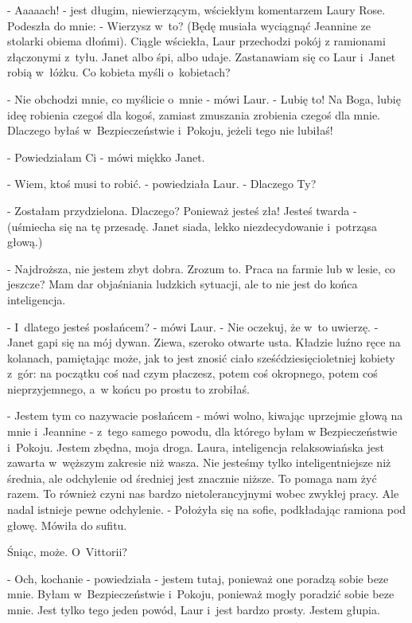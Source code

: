 \documentclass[oneside,polish,12pt,sfheadings]{mwbk}
\begin{document}
- Aaaaach! - jest długim, niewierzącym, wściekłym komentarzem Laury
Rose. Podeszła do mnie: - Wierzysz w~to? (Będę musiała wyciągnąć Jeannine
ze stolarki obiema dłońmi). Ciągle wściekła, Laur przechodzi pokój
z ramionami złączonymi z~tyłu. Janet albo śpi, albo udaje. Zastanawiam
się co Laur i~Janet robią w~łóżku. Co kobieta myśli o~kobietach?

- Nie obchodzi mnie, co myślicie o~mnie - mówi Laur. - Lubię to! Na
Boga, lubię ideę robienia czegoś dla kogoś, zamiast zmuszania zrobienia
czegoś dla mnie. Dlaczego byłaś w~Bezpieczeństwie i~Pokoju, jeżeli
tego nie lubiłaś!

- Powiedziałam Ci - mówi miękko Janet.

- Wiem, ktoś musi to robić. - powiedziała Laur. - Dlaczego Ty?

- Zostałam przydzielona. Dlaczego? Ponieważ jesteś zła! Jesteś twarda - (uśmiecha się na tę przesadę. Janet siada, lekko niezdecydowanie i~potrząsa głową.)

- Najdroższa, nie jestem zbyt dobra. Zrozum to. Praca na farmie lub
w lesie, co jeszcze? Mam dar objaśniania ludzkich sytuacji, ale to
nie jest do końca inteligencja.

- I~dlatego jesteś posłańcem? - mówi Laur. - Nie oczekuj, że w~to
uwierzę. - Janet gapi się na mój dywan. Ziewa, szeroko otwarte usta.
Kładzie luźno ręce na kolanach, pamiętając może, jak to jest znosić
ciało sześćdziesięcioletniej kobiety z~gór: na początku coś nad czym
płaczesz, potem coś okropnego, potem coś nieprzyjemnego, a~w końcu
po prostu to zrobiłaś.

- Jestem tym co nazywacie posłańcem - mówi wolno, kiwając uprzejmie
głową na mnie i~Jeannine - z~tego samego powodu, dla którego byłam
w Bezpieczeństwie i~Pokoju. Jestem zbędna, moja droga. Laura, inteligencja
relaksowiańska jest zawarta w~węższym zakresie niż wasza. Nie jesteśmy
tylko inteligentniejsze niż średnia, ale odchylenie od średniej jest
znacznie niższe. To pomaga nam żyć razem. To również czyni nas bardzo
nietolerancyjnymi wobec zwykłej pracy. Ale nadal istnieje pewne odchylenie.
- Położyła się na sofie, podkładając ramiona pod głowę. Mówiła do
sufitu.

Śniąc, może. O~Vittorii?

- Och, kochanie - powiedziała - jestem tutaj, ponieważ one poradzą
sobie beze mnie. Byłam w~Bezpieczeństwie i~Pokoju, ponieważ mogły
poradzić sobie beze mnie. Jest tylko tego jeden powód, Laur i~jest
bardzo prosty. Jestem głupia.
\end{document}

